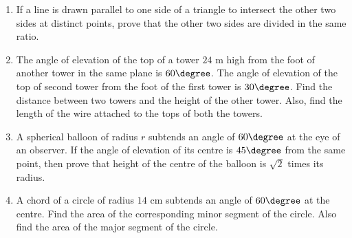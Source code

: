\begin{enumerate}
\begin{figure}[H]
  \caption{}
    \label{fig:figure3}
\end{figure}
\item If a line is drawn parallel to one side of a triangle to intersect the other two sides at distinct points, prove that the other two sides are divided in the same ratio.
\item The angle of elevation of the top of a tower $24$ m high from the foot of another tower in the same plane is ${60}{\degree}$. The angle of elevation of the top of second tower from the foot of the first tower is ${30}{\degree}$. Find the distance between two towers and the height of the other tower. Also, find the length of the wire attached to the tops of both the towers.
\item A spherical balloon of radius $r$ subtends an angle of ${60}{\degree}$ at the eye of an observer. If the angle of elevation of its centre is ${45}{\degree}$ from the same point, then prove that height of the centre of the balloon is $\sqrt{2}$ times its radius.
\item A chord of a circle of radius $14$ cm subtends an angle of ${60}{\degree}$ at the centre. Find the area of the corresponding minor segment of the circle. Also find the area of the major segment of the circle.
\end{enumerate}
%

